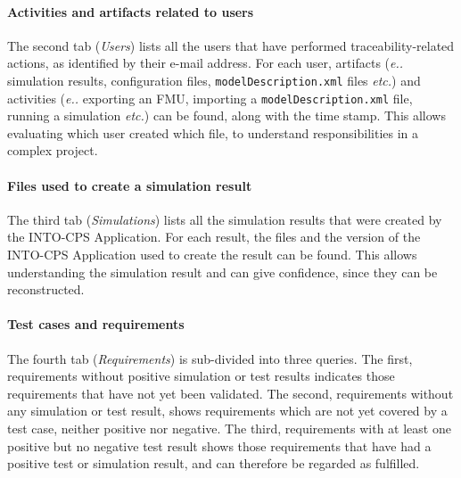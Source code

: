 \paragraph{Activities and artifacts related to users}
The second tab (\emph{Users}) lists all the users that have performed traceability-related actions, as identified by their e-mail address. For each user, artifacts (\emph{e.\@g.\@} simulation results, configuration files, \texttt{model\-Des\-crip\-tion.xml} files \emph{etc.\@}) and activities (\emph{e.\@g.\@} exporting an FMU, importing a \texttt{model\-Des\-crip\-tion.xml} file, running a simulation \emph{etc.\@}) can be found, along with the time stamp. This allows evaluating which user created which file, to understand responsibilities in a complex project.
%
\paragraph{Files used to create a simulation result}
The third tab (\emph{Simulations}) lists all the simulation results that were created by the INTO-CPS Application. For each result, the files and the version of the INTO-CPS Application used to create the result can be found. This allows understanding the simulation result and can give confidence, since they can be reconstructed.
%
\paragraph{Test cases and requirements}
The fourth tab (\emph{Requirements}) is sub-divided into three queries. The first, requirements without positive simulation or test results indicates those requirements that have not yet been validated. The second, requirements without any simulation or test result, shows requirements which are not yet covered by a test case, neither positive nor negative. The third, requirements with at least one positive but no negative test result shows those requirements that have had a positive test or simulation result, and can therefore be regarded as fulfilled.